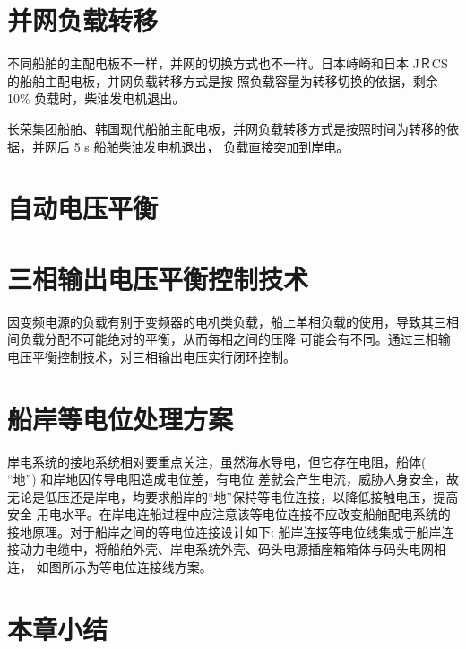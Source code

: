 \section{并网负载转移}

不同船舶的主配电板不一样，并网的切换方式也不一样。日本峙崎和日本 JＲCS 的船舶主配电板，并网负载转移方式是按
照负载容量为转移切换的依据，剩余10\% 负载时，柴油发电机退出。

长荣集团船舶、韩国现代船舶主配电板，并网负载转移方式是按照时间为转移的依据，并网后 5 s 船舶柴油发电机退出，
负载直接突加到岸电。

\section{自动电压平衡}

\section{三相输出电压平衡控制技术}

因变频电源的负载有别于变频器的电机类负载，船上单相负载的使用，导致其三相间负载分配不可能绝对的平衡，从而每相之间的压降
可能会有不同。通过三相输电压平衡控制技术，对三相输出电压实行闭环控制。

\section{船岸等电位处理方案}

岸电系统的接地系统相对要重点关注，虽然海水导电，但它存在电阻，船体( “地”) 和岸地因传导电阻造成电位差，有电位
差就会产生电流，威胁人身安全，故无论是低压还是岸电，均要求船岸的“地”保持等电位连接，以降低接触电压，提高安全
用电水平。在岸电连船过程中应注意该等电位连接不应改变船舶配电系统的接地原理。对于船岸之间的等电位连接设计如下:
船岸连接等电位线集成于船岸连接动力电缆中，将船舶外壳、岸电系统外壳、码头电源插座箱箱体与码头电网相连，
如图所示为等电位连接线方案。


\section{本章小结}